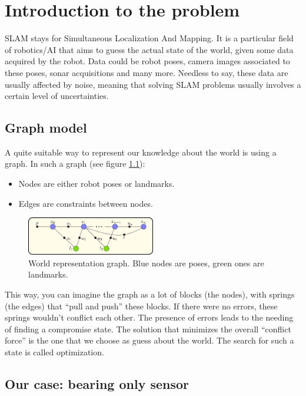 \chapter{Introduction to the problem}\label{cap:Introduction}
SLAM stays for Simultaneous Localization And Mapping. It is a particular field of robotics/AI that aims to guess the actual state of the world, given some data acquired by the robot.
Data could be robot poses, camera images associated to these poses, sonar acquisitions and many more.
Needless to say, these data are usually affected by noise, meaning that solving SLAM problems usually involves a certain level of uncertainties.

\section{Graph model}
A quite suitable way to represent our knowledge about the world is using a graph.
In such a graph (see figure \ref{fig:graph}):
\begin{itemize}
  \item Nodes are either robot poses or landmarks.
  \item Edges are constraints between nodes.
\end{itemize}
\begin{figure}[htbp]
  \centering
    \includegraphics[width=0.5\textwidth]{images/graph.png}
  \caption{World representation graph. Blue nodes are poses, green ones are landmarks.}
  \label{fig:graph}
\end{figure}
This way, you can imagine the graph as a lot of blocks (the nodes), with springs (the edges) that ``pull and push'' these blocks.
If there were no errors, these springs wouldn't conflict each other. The presence of errors leads to the needing of finding a compromise state.
The solution that minimizes the overall ``conflict force'' is the one that we choose as guess about the world. The search for such a state is called optimization.

\section{Our case: bearing only sensor}

